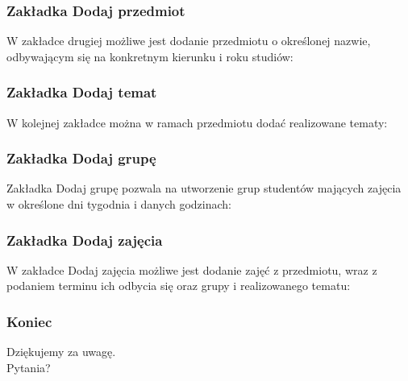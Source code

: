 \documentclass{beamer}
\begin{document}
\begin{frame}
\frametitle{Zakładka Dodaj przedmiot}
W zakładce drugiej możliwe jest dodanie przedmiotu o określonej nazwie, odbywającym się na konkretnym kierunku i roku studiów:

\end{frame}

\begin{frame}
\frametitle{Zakładka Dodaj temat}
W kolejnej zakładce można w ramach przedmiotu dodać realizowane tematy:

\end{frame}

\begin{frame}
\frametitle{Zakładka Dodaj grupę}
Zakładka Dodaj grupę pozwala na utworzenie grup studentów mających zajęcia w określone dni tygodnia i danych godzinach:

\end{frame}

\begin{frame}
\frametitle{Zakładka Dodaj zajęcia}
W zakładce Dodaj zajęcia możliwe jest dodanie zajęć z przedmiotu, wraz z podaniem terminu ich odbycia się oraz grupy i realizowanego tematu:

\end{frame}
\begin{frame}
\frametitle{Koniec}

\begin{block}{}
Dziękujemy za uwagę.\\
Pytania?
\end{block}

\end{frame}

\end{document}
